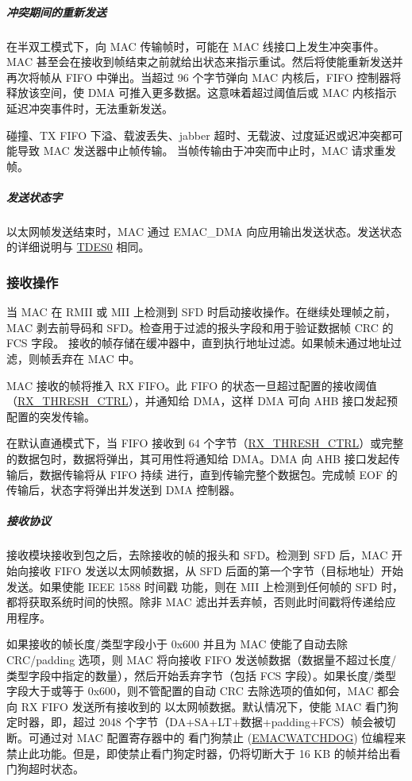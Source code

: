 \documentclass[main\_\_CN.tex]{subfiles}
\begin{document}
\subparagraph{冲突期间的重新发送}\label{sec:ethernetmac-retrans-dur-collision}
在半双工模式下，向 MAC 传输帧时，可能在 MAC 线接口上发生冲突事件。MAC 甚至会在接收到帧结束之前就给出状态来指示重试。然后将使能重新发送并再次将帧从 FIFO 中弹出。当超过 96 个字节弹向 MAC 内核后，FIFO 控制器将释放该空间，使 DMA 可推入更多数据。这意味着超过阈值后或 MAC 内核指示延迟冲突事件时，无法重新发送。

碰撞、TX FIFO 下溢、载波丢失、jabber 超时、无载波、过度延迟或迟冲突都可能导致 MAC 发送器中止帧传输。 当帧传输由于冲突而中止时，MAC 请求重发帧。

\subparagraph{发送状态字}
以太网帧发送结束时，MAC 通过 EMAC\_DMA 向应用输出发送状态。发送状态的详细说明与 \hyperref[tab:ethernetmac-TDES0]{TDES0} 相同。

\subsubsection{接收操作}
当 MAC 在 RMII 或 MII 上检测到 SFD 时启动接收操作。在继续处理帧之前，MAC 剥去前导码和 SFD。检查用于过滤的报头字段和用于验证数据帧 CRC 的 FCS 字段。 接收的帧存储在缓冲器中，直到执行地址过滤。如果帧未通过地址过滤，则帧丢弃在 MAC 中。

MAC 接收的帧将推入 RX FIFO。此 FIFO 的状态一旦超过配置的接收阈值（\hyperref[regdesc:DMAOPERATIONMODEREG]{RX\_THRESH\_CTRL}），并通知给 DMA，这样 DMA 可向 AHB 接口发起预配置的突发传输。

在默认直通模式下，当 FIFO 接收到 64 个字节（\hyperref[regdesc:DMAOPERATIONMODEREG]{RX\_THRESH\_CTRL}）或完整的数据包时，数据将弹出，其可用性将通知给 DMA。DMA 向 AHB 接口发起传输后，数据传输将从 FIFO 持续 进行，直到传输完整个数据包。完成帧 EOF 的传输后，状态字将弹出并发送到 DMA 控制器。


\subparagraph{接收协议}
接收模块接收到包之后，去除接收的帧的报头和 SFD。检测到 SFD 后，MAC 开始向接收 FIFO 发送以太网帧数据，从 SFD 后面的第一个字节（目标地址）开始发送。如果使能 IEEE 1588 时间戳 功能，则在 MII 上检测到任何帧的 SFD 时，都将获取系统时间的快照。除非 MAC 滤出并丢弃帧，否则此时间戳将传递给应用程序。

如果接收的帧长度/类型字段小于 0x600 并且为 MAC 使能了自动去除 CRC/padding 选项，则 MAC 将向接收 FIFO 发送帧数据（数据量不超过长度/类型字段中指定的数量），然后开始丢弃字节（包括 FCS 字段）。如果长度/类型字段大于或等于 0x600，则不管配置的自动 CRC 去除选项的值如何，MAC 都会向 RX FIFO 发送所有接收到的 以太网帧数据。默认情况下，使能 MAC 看门狗定时器，即，超过 2048 个字节（DA+SA+LT+数据+padding+FCS）帧会被切断。可通过对 MAC 配置寄存器中的 看门狗禁止 (\hyperref[regdesc:EMACCONFIGREG]{EMACWATCHDOG}) 位编程来禁止此功能。但是，即使禁止看门狗定时器，仍将切断大于 16 KB 的帧并给出看门狗超时状态。
\end{document}
